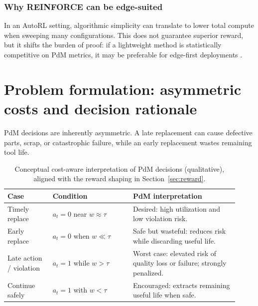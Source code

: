\documentclass[refree,sn-basic]{sn-jnl} %
\begin{document}
\subsubsection{Why REINFORCE can be edge-suited}
In an AutoRL setting, algorithmic simplicity can translate to lower total compute when sweeping many configurations. This does not guarantee superior reward, but it shifts the burden of proof: if a lightweight method is statistically competitive on PdM metrics, it may be preferable for edge-first deployments \cite{Schwartz2020GreenAI, Njor2024TinyML}.

\section{Problem formulation: asymmetric costs and decision rationale}
\label{sec:problem}
PdM decisions are inherently asymmetric. A late replacement can cause defective parts, scrap, or catastrophic failure, while an early replacement wastes remaining tool life.

\begin{table}[t]
        \centering
        \caption{Conceptual cost-aware interpretation of PdM decisions (qualitative), aligned with the reward shaping in Section~\ref{sec:reward}.}
        \label{tab:cost_view}
        \begin{tabular}{p{0.18\linewidth} p{0.32\linewidth} p{0.42\linewidth}}
                \toprule
                \textbf{Case} & \textbf{Condition} & \textbf{PdM interpretation}\\
                \midrule
                Timely replace & $a_t=0$ near $w\approx\tau$ & Desired: high utilization and low violation risk.\\
                Early replace & $a_t=0$ when $w\ll\tau$ & Safe but wasteful: reduces risk while discarding useful life.\\
                Late action / violation & $a_t=1$ while $w>\tau$ & Worst case: elevated risk of quality loss or failure; strongly penalized.\\
                Continue safely & $a_t=1$ with $w<\tau$ & Encouraged: extracts remaining useful life when safe.\\
                \bottomrule
        \end{tabular}
\end{table}
\end{document}
